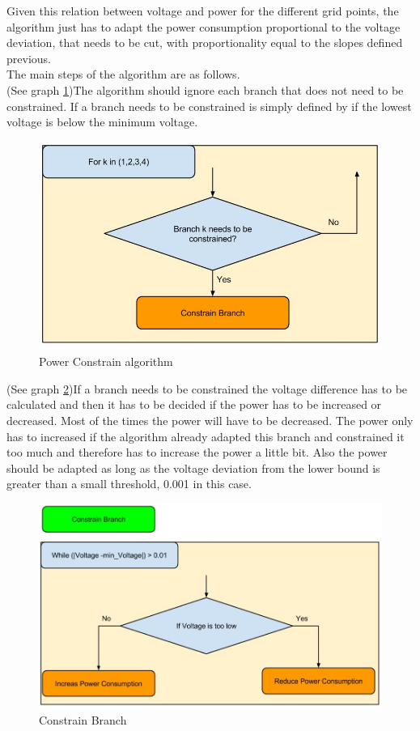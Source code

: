 \documentclass[a4paper]{article}
\begin{document}
Given this relation between voltage and power for the different grid points, the algorithm just has to adapt the power consumption 
proportional to the voltage deviation, that needs to be cut, with proportionality equal to the slopes defined previous. \\
The main steps of the algorithm are as follows. \\
(See graph \ref{constrain1})The algorithm should ignore each branch that does not need to be constrained. If a branch needs to be constrained is simply defined by if 
the lowest voltage is below the minimum voltage.\\
\begin{figure}[!ht]
 \centering
 \includegraphics[width = \textwidth]{constrain1.jpg}
 \caption{Power Constrain algorithm}
 \label{constrain1}
\end{figure}
(See graph \ref{constrain2})If a branch needs to be constrained the voltage difference has to be calculated and then it has to be decided if the power has to be 
increased or decreased. Most of the times the power will have to be decreased. The power only has to increased if the algorithm already
adapted this branch and constrained it too much and therefore has to increase the power a little bit. Also the power should be 
adapted as long as the voltage deviation from the lower bound is greater than a small threshold, 0.001 in this case.\\
\begin{figure}[!ht]
 \centering
 \includegraphics[width = \textwidth]{constrain2.jpg}
 \caption{Constrain Branch}
 \label{constrain2}
\end{figure}
\end{document}
